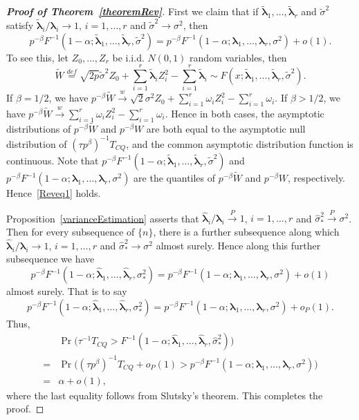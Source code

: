 \documentclass[3p]{elsarticle}
\newcommand{\bfsym}[1]{\ensuremath{\boldsymbol{#1}}}
\def\blambda {\bfsym {\lambda}}        \def\bLambda {\bfsym {\Lambda}}
\theoremstyle{plain}
\theoremstyle{definition}
\theoremstyle{remark}
\begin{document}
\begin{appendices}
\begin{proof}[\textbf{Proof of Theorem~\ref{theoremRev}}]
    First we claim that if $\tilde{\blambda}_1,\ldots, \tilde{\blambda}_r$ and $\tilde{\sigma}^2$ satisfy $\tilde{\blambda}_i/\blambda_i\to 1$, $i=1,\ldots,r$ and $\tilde{\sigma}^2\to \sigma^2$, then
    \begin{equation}\label{Reveq1}
        p^{-\beta}F^{-1}(1-\alpha;\tilde{\blambda}_1,\ldots,\tilde{\blambda}_r,\tilde{\sigma}^2)=
        p^{-\beta}F^{-1}(1-\alpha;\blambda_1,\ldots,\blambda_r,\sigma^2)+o(1).
    \end{equation}
    To see this, let $Z_0,\ldots, Z_r$ be i.i.d. $N(0,1)$ random variables, then
    $$
    \tilde{W}\overset{def}{=}\sqrt{2p}\tilde{\sigma}^2 Z_0
+
        \sum_{i=1}^r \tilde{\blambda}_i Z_i^2
            -
        \sum_{i=1}^r \tilde{\blambda}_i\sim F(x;\tilde{\blambda}_1,\ldots,\tilde{\blambda}_r,\tilde{\sigma}^2).
    $$
If $\beta=1/2$, we have
$
    p^{-\beta}\tilde{W}\xrightarrow{w}
\sqrt{2}\sigma^2 Z_0 + \sum_{i=1}^r \omega_i Z_i^2 -\sum_{i=1}^r \omega_i
$.
If $\beta>1/2$, we have
$
    p^{-\beta}\tilde{W}\xrightarrow{w}
\sum_{i=1}^r \omega_i Z_i^2 -\sum_{i=1}^r \omega_i.
$
    Hence in both cases, the asymptotic distributions of $p^{-\beta}\tilde{W}$ and $p^{-\beta}W$ are both equal to the asymptotic null distribution of $(\tau p^{\beta})^{-1}T_{CQ}$, and the common asymptotic distribution function is continuous.
Note that
$
        p^{-\beta}F^{-1}(1-\alpha;\tilde{\blambda}_1,\ldots,\tilde{\blambda}_r,\tilde{\sigma}^2)
    $
     and
$
        p^{-\beta}F^{-1}(1-\alpha;\blambda_1,\ldots,\blambda_r,\sigma^2)
    $
    are the quantiles of $p^{-\beta}\tilde{W}$ and $p^{-\beta}W$, respectively.
    Hence~\eqref{Reveq1} holds. 
    
    Proposition~\ref{varianceEstimation} asserts that $\hat{\blambda}_i/\blambda_i\xrightarrow{P} 1$, $i=1,\ldots,r$ and $\hat{\sigma}_*^2\xrightarrow{P} \sigma^2$.
    Then for every subsequence of $\{n\}$, there is a further subsequence along which $\hat{\blambda}_i/\blambda_i\to 1$, $i=1,\ldots,r$ and $\hat{\sigma}_*^2\to \sigma^2$ almost surely.
    Hence along this further subsequence we have
    $$
        p^{-\beta}F^{-1}(1-\alpha;\hat{\blambda}_1,\ldots,\hat{\blambda}_r,\sigma_{*}^2)=
        p^{-\beta}F^{-1}(1-\alpha;\blambda_1,\ldots,\blambda_r,\sigma^2)+o(1)
    $$
    almost surely.
    That is to say
    $$
        p^{-\beta}F^{-1}(1-\alpha;\hat{\blambda}_1,\ldots,\hat{\blambda}_r,\sigma_{*}^2)=
        p^{-\beta}F^{-1}(1-\alpha;\blambda_1,\ldots,\blambda_r,\sigma^2)+o_P(1).
    $$
    Thus,
    $$
    \begin{aligned}
        &\Pr\big(\tau^{-1}T_{CQ} > F^{-1}(1-\alpha;\hat{\blambda}_1,\ldots,\hat{\blambda}_r,\hat{\sigma}_*^2)\big)
        \\
        =&
    \Pr\big((\tau p^{\beta})^{-1}T_{CQ} +o_P(1) > p^{-\beta}F^{-1}(1-\alpha;\blambda_1,\ldots,\blambda_r,\sigma^2)\big)
        \\
        =& \alpha +o(1),
    \end{aligned}
    $$
    where the last equality follows from Slutsky's theorem.
    This completes the proof.
\end{proof}





\end{appendices}
\end{document}
